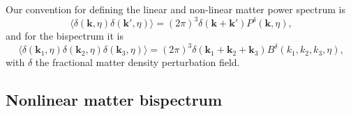 \documentclass[11pt]{article} %
\begin{document}
Our convention for defining the linear and non-linear matter power spectrum is
\begin{equation*}
    \langle \delta(\mathbf k, \eta) \delta(\mathbf{k}',\eta) \rangle = (2\pi)^3\delta(\mathbf k + \mathbf k ')P^\delta(\mathbf k, \eta),
\end{equation*}
and for the bispectrum it is 
\begin{equation*}
    \langle \delta(\mathbf k_1, \eta) \delta(\mathbf k_2, \eta)\delta(\mathbf k_3, \eta) \rangle = (2\pi)^3\delta(\mathbf k_1 + \mathbf k_2 + \mathbf k_3)B^\delta(k_1,k_2,k_3, \eta),
\end{equation*}
with $\delta$ the fractional matter density perturbation field.

\subsection{Nonlinear matter bispectrum}
\end{document}
